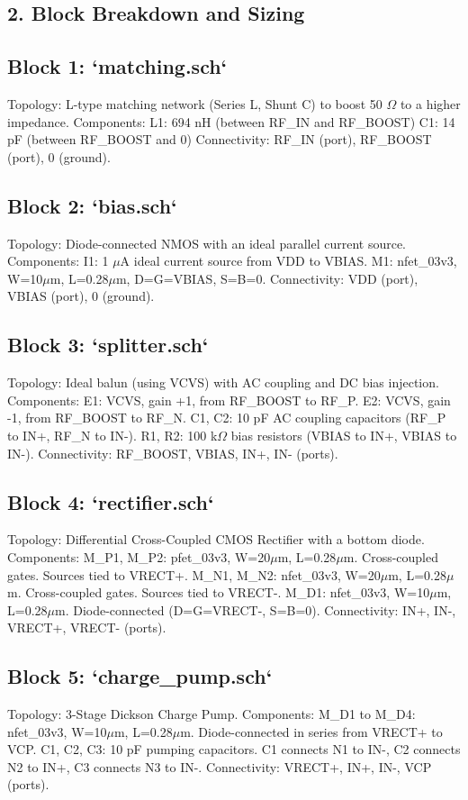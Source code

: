 \documentclass[journal]{IEEEtran}
\begin{document}
\subsection{2. Block Breakdown and Sizing}
\subsection{Block 1: `matching.sch`}
Topology: L-type matching network (Series L, Shunt C) to boost 50 $\Omega$ to a higher impedance.
Components:
L1: 694 nH (between RF\_IN and RF\_BOOST)
C1: 14 pF (between RF\_BOOST and 0)
Connectivity: RF\_IN (port), RF\_BOOST (port), 0 (ground).
\subsection{Block 2: `bias.sch`}
Topology: Diode-connected NMOS with an ideal parallel current source.
Components:
I1: 1 $\mu$A ideal current source from VDD to VBIAS.
M1: nfet\_03v3, W=10$\mu$m, L=0.28$\mu$m, D=G=VBIAS, S=B=0.
Connectivity: VDD (port), VBIAS (port), 0 (ground).
\subsection{Block 3: `splitter.sch`}
Topology: Ideal balun (using VCVS) with AC coupling and DC bias injection.
Components:
E1: VCVS, gain +1, from RF\_BOOST to RF\_P.
E2: VCVS, gain -1, from RF\_BOOST to RF\_N.
C1, C2: 10 pF AC coupling capacitors (RF\_P to IN+, RF\_N to IN-).
R1, R2: 100 k$\Omega$ bias resistors (VBIAS to IN+, VBIAS to IN-).
Connectivity: RF\_BOOST, VBIAS, IN+, IN- (ports).
\subsection{Block 4: `rectifier.sch`}
Topology: Differential Cross-Coupled CMOS Rectifier with a bottom diode.
Components:
M\_P1, M\_P2: pfet\_03v3, W=20$\mu$m, L=0.28$\mu$m. Cross-coupled gates. Sources tied to VRECT+.
M\_N1, M\_N2: nfet\_03v3, W=20$\mu$m, L=0.28$\mu$m. Cross-coupled gates. Sources tied to VRECT-.
M\_D1: nfet\_03v3, W=10$\mu$m, L=0.28$\mu$m. Diode-connected (D=G=VRECT-, S=B=0).
Connectivity: IN+, IN-, VRECT+, VRECT- (ports).
\subsection{Block 5: `charge\_pump.sch`}
Topology: 3-Stage Dickson Charge Pump.
Components:
M\_D1 to M\_D4: nfet\_03v3, W=10$\mu$m, L=0.28$\mu$m. Diode-connected in series from VRECT+ to VCP.
C1, C2, C3: 10 pF pumping capacitors. C1 connects N1 to IN-, C2 connects N2 to IN+, C3 connects N3 to IN-.
Connectivity: VRECT+, IN+, IN-, VCP (ports).
\end{document}
